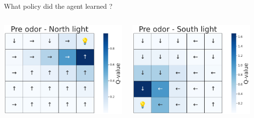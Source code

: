 \documentclass[bigger]{beamer}
\begin{document}
\begin{frame}[label={sec:org3de0d40}]{What policy did the agent learned ?}
\vspace{-7em}
\begin{columns}
\begin{column}[t]{0.5\columnwidth}
\begin{center}
\includegraphics[height=0.4\textheight]{img/policy-allo-north-light.png}
\end{center}
\end{column}
\begin{column}[t]{0.5\columnwidth}
\begin{center}
\includegraphics[height=0.4\textheight]{img/policy-allo-south-light.png}
\end{center}
\end{column}
\end{columns}
\end{frame}
\end{document}
